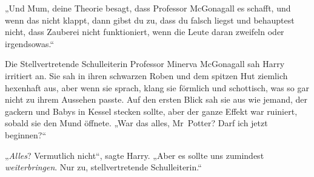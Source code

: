 „Und Mum, deine Theorie besagt, dass Professor McGonagall es schafft, und wenn das nicht klappt, dann gibst du zu, dass du falsch liegst und behauptest nicht, dass Zauberei nicht funktioniert, wenn die Leute daran zweifeln oder irgendsowas.“

Die Stellvertretende Schulleiterin Professor Minerva McGonagall sah Harry irritiert an. Sie sah in ihren schwarzen Roben und dem spitzen Hut ziemlich hexenhaft aus, aber wenn sie sprach, klang sie förmlich und schottisch, was so gar nicht zu ihrem Aussehen passte. Auf den ersten Blick sah sie aus wie jemand, der gackern und Babys in Kessel stecken sollte, aber der ganze Effekt war ruiniert, sobald sie den Mund öffnete. „War das alles, Mr~Potter? Darf ich jetzt beginnen?“

„\emph{Alles}? Vermutlich nicht“, sagte Harry. „Aber es sollte uns zumindest \emph{weiterbringen}. Nur zu, stellvertretende Schulleiterin.“

